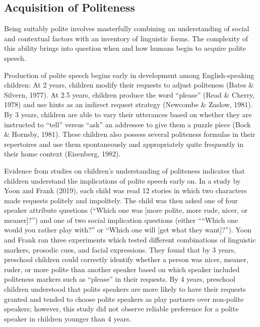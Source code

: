 \documentclass[
  english,
  man,floatsintext]{apa6}
\begin{document}
\hypertarget{acquisition-of-politeness}{%
\subsection{Acquisition of Politeness}\label{acquisition-of-politeness}}

Being suitably polite involves masterfully combining an understanding of social and contextual factors with an inventory of linguistic forms. The complexity of this ability brings into question when and how humans begin to acquire polite speech.

Production of polite speech begins early in development among English-speaking children: At 2 years, children modify their requests to adjust politeness (Bates \& Silvern, 1977). At 2.5 years, children produce the word ``please'' (Read \& Cherry, 1978) and use hints as an indirect request strategy (Newcombe \& Zaslow, 1981). By 3 years, children are able to vary their utterances based on whether they are instructed to ``tell'' versus ``ask'' an addressee to give them a puzzle piece (Bock \& Hornsby, 1981). These children also possess several politeness formulas in their repertoires and use them spontaneously and appropriately quite frequently in their home context (Eisenberg, 1982).

Evidence from studies on children's understanding of politeness indicates that children understand the implications of polite speech early on. In a study by Yoon and Frank (2019), each child was read 12 stories in which two characters made requests politely and impolitely. The child was then asked one of four speaker attribute questions (``Which one was {[}more polite, more rude, nicer, or meaner{]}?'') and one of two social implication questions (either ````Which one would you rather play with?'' or ``Which one will {[}get what they want{]}?''). Yoon and Frank ran three experiments which tested different combinations of linguistic markers, prosodic cues, and facial expressions. They found that by 3 years, preschool children could correctly identify whether a person was nicer, meaner, ruder, or more polite than another speaker based on which speaker included politeness markers such as ``please'' in their requests. By 4 years, preschool children understood that polite speakers are more likely to have their requests granted and tended to choose polite speakers as play partners over non-polite speakers; however, this study did not observe reliable preference for a polite speaker in children younger than 4 years.
\end{document}
